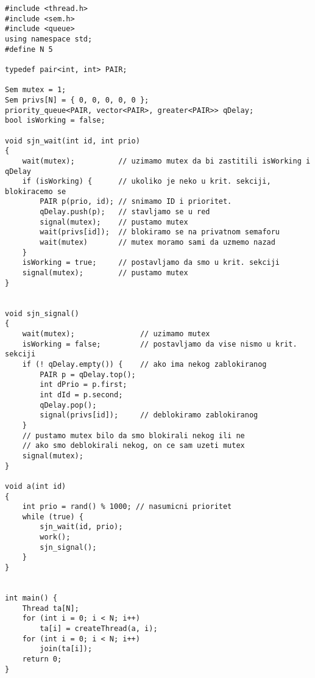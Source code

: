 \begin{lstlisting}
#include <thread.h>
#include <sem.h>
#include <queue>
using namespace std;
#define N 5

typedef pair<int, int> PAIR;

Sem mutex = 1;
Sem privs[N] = { 0, 0, 0, 0, 0 };
priority_queue<PAIR, vector<PAIR>, greater<PAIR>> qDelay;
bool isWorking = false;

void sjn_wait(int id, int prio)
{
    wait(mutex);          // uzimamo mutex da bi zastitili isWorking i qDelay
    if (isWorking) {      // ukoliko je neko u krit. sekciji, blokiracemo se
        PAIR p(prio, id); // snimamo ID i prioritet.
        qDelay.push(p);   // stavljamo se u red
        signal(mutex);    // pustamo mutex
        wait(privs[id]);  // blokiramo se na privatnom semaforu
        wait(mutex)       // mutex moramo sami da uzmemo nazad 
    } 
    isWorking = true;     // postavljamo da smo u krit. sekciji
    signal(mutex);        // pustamo mutex
}


void sjn_signal() 
{
    wait(mutex);               // uzimamo mutex
    isWorking = false;         // postavljamo da vise nismo u krit. sekciji
    if (! qDelay.empty()) {    // ako ima nekog zablokiranog
        PAIR p = qDelay.top();
        int dPrio = p.first;
        int dId = p.second;
        qDelay.pop();
        signal(privs[id]);     // deblokiramo zablokiranog
    }
    // pustamo mutex bilo da smo blokirali nekog ili ne
    // ako smo deblokirali nekog, on ce sam uzeti mutex
    signal(mutex);
}

void a(int id) 
{
    int prio = rand() % 1000; // nasumicni prioritet
    while (true) {
        sjn_wait(id, prio);
        work();
        sjn_signal();
    }
}


int main() {
    Thread ta[N];
    for (int i = 0; i < N; i++)
        ta[i] = createThread(a, i);
    for (int i = 0; i < N; i++)
		join(ta[i]);
    return 0;
}

\end{lstlisting}
